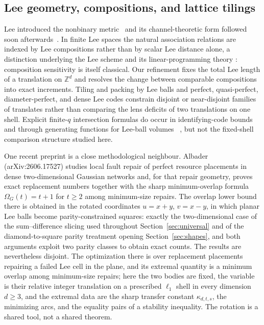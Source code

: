 \documentclass[pdflatex,sn-mathphys-num]{sn-jnl}
\theoremstyle{thmstyleone}
\theoremstyle{thmstylethree}
\theoremstyle{thmstyletwo}
\newcommand{\Z}{\mathbb Z}
\begin{document}
\subsection{Lee geometry, compositions, and lattice tilings}

Lee introduced the nonbinary metric~\cite{Lee58} and its channel-theoretic
form followed soon afterwards~\cite{ChiangWolf71}.  In finite Lee spaces the
natural association relations are indexed by Lee compositions rather than by
scalar Lee distance alone, a distinction underlying the Lee scheme and its
linear-programming theory \cite{Astola82Scheme,AstolaTabus16}: composition
sensitivity is itself classical.  Our refinement fixes the total Lee length
of a translation on $\Z^d$ and resolves the change between comparable
compositions into exact increments.  Tiling and packing by Lee balls
\cite{GolombWelch70,Post75,Horak09Tilings,HorakKim18,ZhangZhou19,LeungZhou20}
and perfect, quasi-perfect, diameter-perfect, and dense Lee codes
\cite{Etzion11,HorakAlBdaiwi12,ZhangGe24Diameter,XiaoZhou24} constrain
disjoint or near-disjoint families of translates rather than comparing the
lens deficits of two translations on one shell.
Explicit finite-$q$ intersection formulas do occur in identifying-code
bounds~\cite{RD21} and through generating functions for Lee-ball volumes
~\cite{BhattacharyaBanerjee19}, but not the fixed-shell comparison
structure studied here.

One recent preprint is a close methodological neighbour.  Albader
(arXiv:2606.17527) studies local fault repair
of perfect resource placements in dense two-dimensional Gaussian networks
and, for that repair geometry, proves exact replacement numbers together
with the sharp minimum-overlap formula $\Omega_G(t)=t+1$ for $t\ge2$ among
minimum-size repairs.  The overlap lower bound there is obtained in the
rotated coordinates $u=x+y$, $v=x-y$, in which planar Lee balls become
parity-constrained squares: exactly the
two-dimensional case of the sum--difference slicing used throughout
Section~\ref{sec:universal} and of the diamond-to-square parity treatment
opening Section~\ref{sec:shapes}, and both arguments exploit two parity
classes to obtain exact counts.  The results are nevertheless disjoint.
The optimization there is over replacement placements repairing a failed
Lee cell in the plane, and its extremal quantity is a minimum overlap among
minimum-size repairs; here the two bodies are fixed, the variable is their
relative integer translation on a prescribed $\ell_1$ shell in every
dimension $d\ge3$, and the extremal data are the sharp transfer constant
$\kappa_{d,t,s}$, the minimizing arcs, and the equality pairs of a
stability inequality.  The rotation is a shared tool, not a shared theorem.
\end{document}
